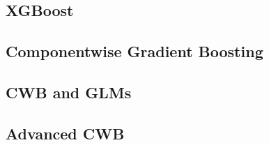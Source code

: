 \subsection{XGBoost}


\subsection{Componentwise Gradient Boosting}


\subsection{CWB and GLMs}


\subsection{Advanced CWB}









